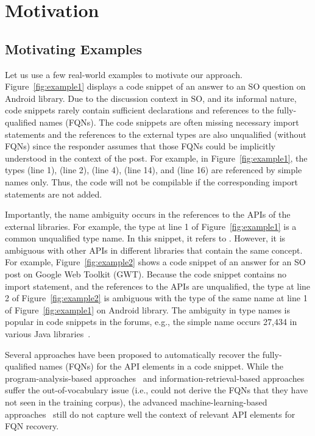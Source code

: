 \section{Motivation}
\label{motiv:sec}

\subsection{Motivating Examples}
\label{examples:sec}



Let us use a few real-world examples to motivate our approach.
Figure~\ref{fig:example1} displays a code snippet of an answer to an
SO question on Android library. Due to the discussion context in SO,
and its informal nature, code snippets rarely contain sufficient
declarations and references to the fully-qualified names (FQNs). The
code snippets are often missing necessary import statements and the
references to the external types are also unqualified (without
FQNs) since the responder assumes that those FQNs could be implicitly
understood in the context of the post. For example, in
Figure~\ref{fig:example1}, the types  (line 1),
 (line 2),  (line 4),  (line
14), and  (line 16) are referenced by simple names
only. Thus, the code will not be compilable if the corresponding
import statements are not added.



Importantly, the name ambiguity occurs in the references to the APIs
of the external libraries. For example, the type  at line
1 of Figure~\ref{fig:example1} is a common unqualified type name. In
this snippet, it refers to . However, it
is ambiguous with other APIs in different libraries that
contain the same concept. For example, Figure~\ref{fig:example2} shows
a code snippet of an answer for an SO post on Google Web Toolkit
(GWT). Because the code snippet contains no import statement, and the
references to the APIs are unqualified, the type  at line
2 of Figure~\ref{fig:example2} is ambiguous with the type of the same
name at line 1 of Figure~\ref{fig:example1} on Android library. The
ambiguity in type names is popular in code snippets in the forums,
e.g., the simple name  occurs 27,434 in various Java
libraries~\cite{liveapi14}.

Several approaches have been proposed to automatically recover the
fully-qualified names (FQNs) for the API elements in a code snippet.
While the program-analysis-based approaches~\cite{tien} and
information-retrieval-based approaches~\cite{tien} suffer the
out-of-vocabulary issue (i.e., could not derive the FQNs that they
have not seen in the training corpus), the advanced
machine-learning-based approaches~\cite{tien} still do not capture
well the context of relevant API elements for FQN recovery.


